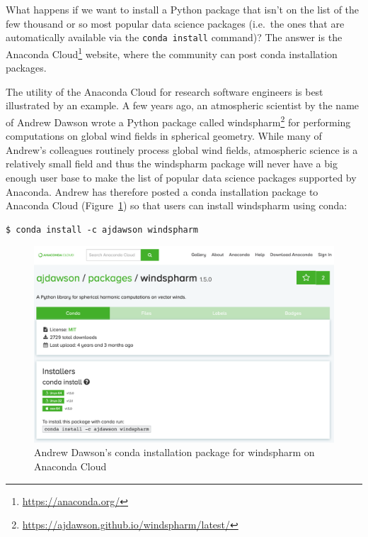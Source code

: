 \documentclass[
]{krantz}
\renewcommand{\href}[2]{#2\footnote{\url{#1}}}
\begin{document}
What happens if we want to install a Python package
that isn't on the list of the few thousand or so most popular data science packages
(i.e.~the ones that are automatically available via the \texttt{conda\ install} command)?
The answer is the \href{https://anaconda.org/}{Anaconda Cloud} website,
where the community can post conda installation packages.

The utility of the Anaconda Cloud for research software engineers
is best illustrated by an example.
A few years ago, an atmospheric scientist by the name of Andrew Dawson
wrote a Python package called \href{https://ajdawson.github.io/windspharm/latest/}{windspharm}
for performing computations on global wind fields in spherical geometry.
While many of Andrew's colleagues routinely process global wind fields,
atmospheric science is a relatively small field and thus the windspharm package
will never have a big enough user base to make the list of
popular data science packages supported by Anaconda.
Andrew has therefore posted a conda installation package to Anaconda Cloud
(Figure~\ref{fig:anaconda-windspharm-ajdawson})
so that users can install windspharm using conda:

\begin{verbatim}
$ conda install -c ajdawson windspharm
\end{verbatim}

\begin{figure}

{\centering \includegraphics[width=1\linewidth]{figures/anaconda/cloud-windspharm-ajdawson} 

}

\caption{Andrew Dawson's conda installation package for windspharm on Anaconda Cloud}\label{fig:anaconda-windspharm-ajdawson}
\end{figure}
\end{document}
